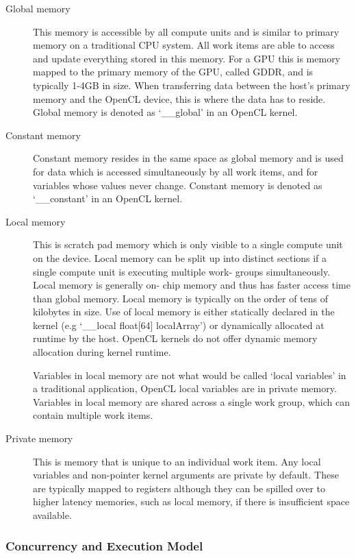 \begin{description}

\item[Global memory] This memory is accessible by all compute units and is
similar to primary memory on a traditional CPU system. All work items are able
to access and update everything stored in this memory. For a GPU this is memory
mapped to the primary memory of the GPU, called GDDR, and is typically 1-4GB in
size. When transferring data between the host's primary memory and the OpenCL
device, this is where the data has to reside. Global memory is denoted as
`\_\_global' in an OpenCL kernel.

\item[Constant memory] Constant memory resides in the same space as global
memory and is used for data which is accessed simultaneously by all work items,
and for variables whose values never change. Constant memory is denoted as
`\_\_constant' in an OpenCL kernel.

\item[Local memory] This is scratch pad memory which is only visible to a single
compute unit on the device. Local memory can be split up into distinct sections
if a single compute unit is executing multiple work- groups simultaneously.
Local memory is generally on- chip memory and thus has faster access time than
global memory. Local memory is typically on the order of tens of kilobytes in
size. Use of local memory is either statically declared in the kernel (e.g
`\_\_local float[64] localArray') or dynamically allocated at runtime by the
host. OpenCL kernels do not offer dynamic memory allocation during kernel
runtime.

Variables in local memory are not what would be called `local variables' in a
traditional application, OpenCL local variables are in private memory. Variables
in local memory are shared across a single work group, which can contain
multiple work items.

\item[Private memory] This is memory that is unique to an individual work item.
Any local variables and non-pointer kernel arguments are private by default.
These are typically mapped to registers although they can be spilled over to
higher latency memories, such as local memory, if there is insufficient space
available.

\end{description}

\subsubsection{Concurrency and Execution Model}

